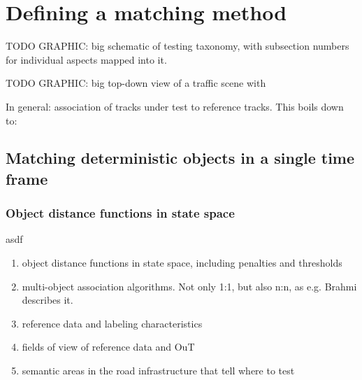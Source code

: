 \documentclass[conference]{IEEEtran}
\begin{document}






  






\section{Defining a matching method}
\label{sec:criteria}

TODO GRAPHIC: big schematic of testing taxonomy, with subsection numbers for individual aspects mapped into it.


TODO GRAPHIC: big top-down view of a traffic scene with 

In general: association of tracks under test to reference tracks. This boils down to:

\subsection{Matching deterministic objects in a single time frame}

\subsubsection{Object distance functions in state space}
asdf

\begin{enumerate}
\item object distance functions in state space, including penalties and thresholds
\item multi-object association algorithms. Not only 1:1, but also n:n, as e.g. Brahmi \cite[Sec. 10.3]{Brahmi2020diss} describes it.
\item reference data and labeling characteristics
\item fields of view of reference data and OuT
\item semantic areas in the road infrastructure that tell where to test
\end{enumerate}
\end{document}
